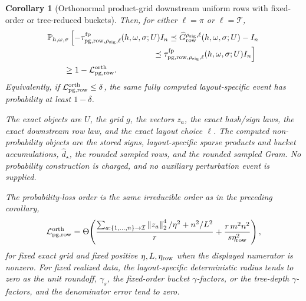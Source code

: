 \documentclass[11pt]{article}
\newcommand{\Prob}{\mathbb{P}}
\newcommand{\Norm}[1]{\left\lVert #1\right\rVert_2}
\newcommand{\I}{I}
\newtheorem{corollary}[theorem]{Corollary}
\theoremstyle{remark}
\begin{document}
\begin{corollary}[Orthonormal product-grid downstream uniform rows with fixed-order or tree-reduced buckets]
Then, for either \(\ell=\pi\) or \(\ell=\mathcal T\),
\[
\begin{aligned}
&\Prob_{h,\omega,\sigma}
  \left[
    -\tau_{{\rm pg,row},\rho_{\rm sig},\ell}^{\rm fp}
      (h,\omega,\sigma;U)\I_n
    \preceq
    \widehat G_{{\rm row}}^{\rho_{\rm sig},\ell}(h,\omega,\sigma;U)-\I_n
  \right.
\\[-2pt]
&\left.\hspace{4.5cm}
    \preceq
    \tau_{{\rm pg,row},\rho_{\rm sig},\ell}^{\rm fp}
      (h,\omega,\sigma;U)\I_n
  \right]
\\
&\qquad\ge
  1-\mathcal L_{\rm pg,row}^{\rm orth}.
\end{aligned}
\]
Equivalently, if \(\mathcal L_{\rm pg,row}^{\rm orth}\le\delta\), the same
fully computed layout-specific event has probability at least \(1-\delta\).

The exact objects are \(U\), the grid \(g\), the vectors \(z_a\), the exact
hash/sign laws, the exact downstream row law, and the exact layout choice
\(\ell\).  The computed non-probability objects are the stored signs,
layout-specific sparse products and bucket accumulations, \(\widehat d_\star\),
the rounded sampled rows, and the rounded sampled Gram.  No probability
construction is charged, and no auxiliary perturbation event is supplied.

The probability-loss order is the same irreducible order as in the preceding
corollary,
\[
  \mathcal L_{\rm pg,row}^{\rm orth}
  =
  \Theta\!\left(
    \frac{
      \sum_{a:\{1,\ldots,n\}\to\mathcal I}\Norm{z_a}^4/\eta^2
      +
      n^2/L^2
    }{r}
    +
    \frac{r\,m^2n^2}{s\eta_{\rm row}^2}
  \right),
\]
for fixed exact grid and fixed positive \(\eta,L,\eta_{\rm row}\) when the
displayed numerator is nonzero.  For fixed realized data, the layout-specific
deterministic radius tends to zero as the unit roundoff, \(\gamma_s\),
the fixed-order bucket \(\gamma\)-factors, or the tree-depth
\(\gamma\)-factors, and the denominator error tend to zero.
\end{corollary}
\end{document}
